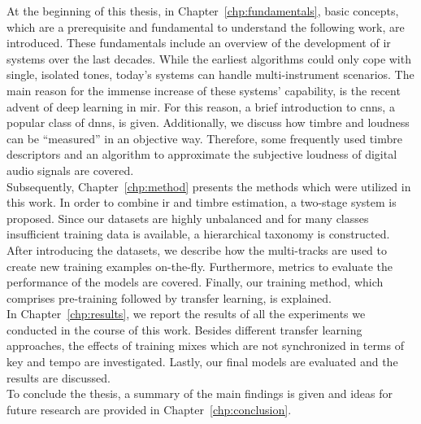 
At the beginning of this thesis, in Chapter~\ref{chp:fundamentals}, basic concepts, which are a prerequisite and fundamental to understand the following work, are introduced. These fundamentals include an overview of the development of \gls{ir} systems over the last decades. While the earliest algorithms could only cope with single, isolated tones, today's systems can handle multi-instrument scenarios. The main reason for the immense increase of these systems' capability, is the recent advent of deep learning in \gls{mir}. For this reason, a brief introduction to \glspl{cnn}, a popular class of \glspl{dnn}, is given. Additionally, we discuss how timbre and loudness can be \enquote{measured} in an objective way. Therefore, some frequently used timbre descriptors and an algorithm to approximate the subjective loudness of digital audio signals are covered.\\

Subsequently, Chapter~\ref{chp:method} presents the methods which were utilized in this work. In order to combine \gls{ir} and timbre estimation, a two-stage system is proposed. Since our datasets are highly unbalanced and for many classes insufficient training data is available, a hierarchical taxonomy is constructed. After introducing the datasets, we describe how the multi-tracks are used to create new training examples on-the-fly. Furthermore, metrics to evaluate the performance of the models are covered. Finally, our training method, which comprises pre-training followed by transfer learning, is explained.\\

In Chapter~\ref{chp:results}, we report the results of all the experiments we conducted in the course of this work. Besides different transfer learning approaches, the effects of training mixes which are not synchronized in terms of key and tempo are investigated. Lastly, our final models are evaluated and the results are discussed.\\

To conclude the thesis, a summary of the main findings is given and ideas for future research are provided in Chapter~\ref{chp:conclusion}.